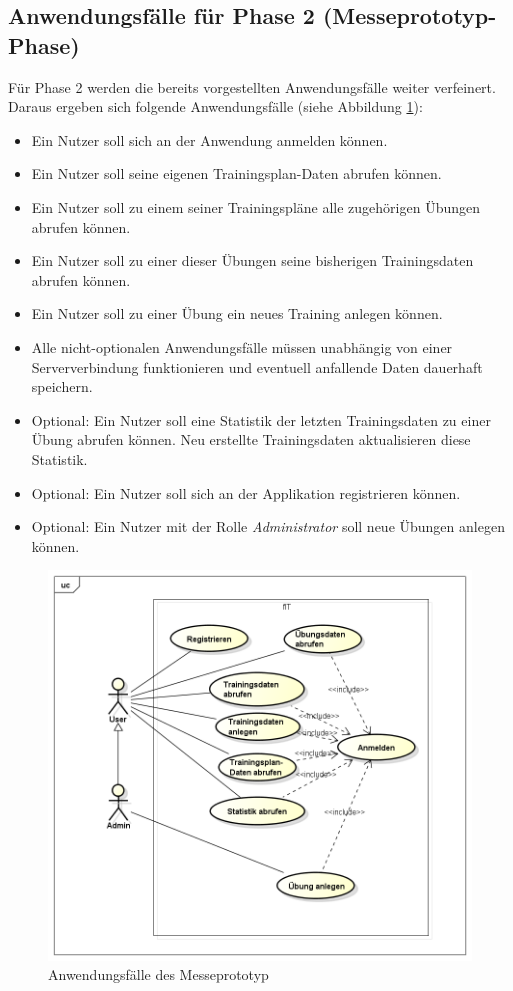 \subsection{Anwendungsfälle für Phase 2 (Messeprototyp-Phase)}
\label{ssec:anwendungsfaelle-messe}
Für Phase 2 werden die bereits vorgestellten Anwendungsfälle weiter verfeinert. Daraus ergeben sich folgende Anwendungsfälle (siehe Abbildung \ref{pic:usecase-messe}):
\begin{itemize}
\item Ein Nutzer soll sich an der Anwendung anmelden können.
\item Ein Nutzer soll seine eigenen Trainingsplan-Daten abrufen können.
\item Ein Nutzer soll zu einem seiner Trainingspläne alle zugehörigen Übungen abrufen können.
\item Ein Nutzer soll zu einer dieser Übungen seine bisherigen Trainingsdaten abrufen können.
\item Ein Nutzer soll zu einer Übung ein neues Training anlegen können.
\item Alle nicht-optionalen Anwendungsfälle müssen unabhängig von einer Serververbindung funktionieren und eventuell anfallende Daten dauerhaft speichern.
\item Optional: Ein Nutzer soll eine Statistik der letzten Trainingsdaten zu einer Übung abrufen können. Neu erstellte Trainingsdaten aktualisieren diese Statistik.
\item Optional: Ein Nutzer soll sich an der Applikation registrieren können.
\item Optional: Ein Nutzer mit der Rolle \textit{Administrator} soll neue Übungen anlegen können.
\end{itemize}

\begin{figure}[h]
\centering
\includegraphics[width=0.8\linewidth]{content/images/UseCase-Messeprototyp.png}
\caption{Anwendungsfälle des Messeprototyp}
\label{pic:usecase-messe}
\end{figure}
\newpage
